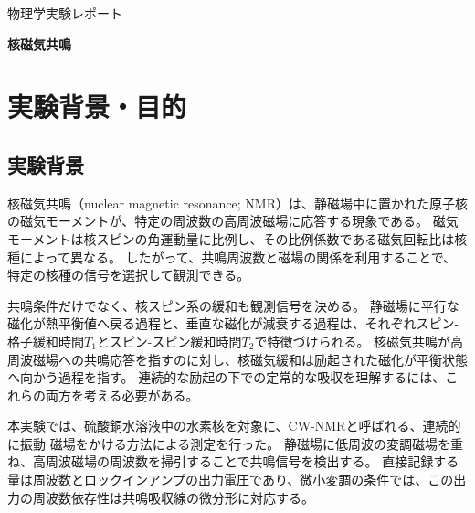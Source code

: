 \documentclass[dvipdfmx,a4paper,11pt]{jsarticle}
\newcommand{\reporttitle}{核磁気共鳴}
\begin{document}
\hypersetup{pageanchor=false}
\begin{titlepage}
  \centering
  \vspace*{25mm}
  {\Large 物理学実験レポート\par}
  \vspace{15mm}
  {\huge\bfseries \reporttitle\par}
  \vspace{25mm}
  \vfill
\end{titlepage}
\hypersetup{pageanchor=true}

\tableofcontents
\clearpage

\section{実験背景・目的}
\label{sec:purpose}

\subsection{実験背景}
核磁気共鳴（nuclear magnetic resonance; NMR）は、静磁場中に置かれた原子核の磁気モーメントが、特定の周波数の高周波磁場に応答する現象である。
磁気モーメントは核スピンの角運動量に比例し、その比例係数である磁気回転比は核種によって異なる。
したがって、共鳴周波数と磁場の関係を利用することで、特定の核種の信号を選択して観測できる\cite{manual}。

共鳴条件だけでなく、核スピン系の緩和も観測信号を決める。
静磁場に平行な磁化が熱平衡値へ戻る過程と、垂直な磁化が減衰する過程は、それぞれスピン-格子緩和時間$T_1$とスピン-スピン緩和時間$T_2$で特徴づけられる。
核磁気共鳴が高周波磁場への共鳴応答を指すのに対し、核磁気緩和は励起された磁化が平衡状態へ向かう過程を指す。
連続的な励起の下での定常的な吸収を理解するには、これらの両方を考える必要がある。

本実験では、硫酸銅水溶液中の水素核を対象に、CW-NMRと呼ばれる、連続的に振動
磁場をかける方法による測定を行った。
静磁場に低周波の変調磁場を重ね、高周波磁場の周波数を掃引することで共鳴信号を検出する。
直接記録する量は周波数とロックインアンプの出力電圧であり、微小変調の条件では、この出力の周波数依存性は共鳴吸収線の微分形に対応する。

\end{document}
